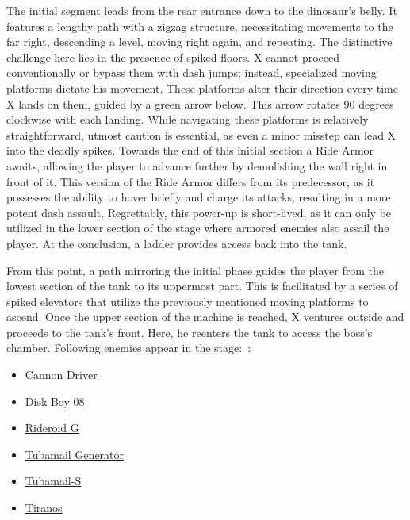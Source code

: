 The initial segment leads from the rear entrance down to the dinosaur's belly. It features a lengthy path with a zigzag structure, necessitating movements to the far right, descending a level, moving right again, and repeating. The distinctive challenge here lies in the presence of spiked floors. X cannot proceed conventionally or bypass them with dash jumps; instead, specialized moving platforms dictate his movement. These platforms alter their direction every time X lands on them, guided by a green arrow below. This arrow rotates 90 degrees clockwise with each landing. While navigating these platforms is relatively straightforward, utmost caution is essential, as even a minor misstep can lead X into the deadly spikes. Towards the end of this initial section a Ride Armor awaits, allowing the player to advance further by demolishing the wall right in front of it. This version of the Ride Armor differs from its predecessor, as it possesses the ability to hover briefly and charge its attacks, resulting in a more potent dash assault. Regrettably, this power-up is short-lived, as it can only be utilized in the lower section of the stage where armored enemies also assail the player. At the conclusion, a ladder provides access back into the tank.

From this point, a path mirroring the initial phase guides the player from the lowest section of the tank to its uppermost part. This is facilitated by a series of spiked elevators that utilize the previously mentioned moving platforms to ascend. Once the upper section of the machine is reached, X ventures outside and proceeds to the tank's front. Here, he  reenters the tank to access the boss's chamber.
Following enemies appear in the stage:~\cite{wiki:Dinosaur_tank}:
\begin{itemize}
	\item \hyperlink {enem:Cannon_Driver}{Cannon Driver}
	\item \hyperlink {enem:Disk_Boy_08}{Disk Boy 08}
	\item \hyperlink {enem:Rideroid G}{Rideroid G}
	\item \hyperlink {enem:Tubamail_Generator}{Tubamail Generator}
	\item \hyperlink {enem:Tubamail-S}{Tubamail-S}
	\item \hyperlink {enem:Tiranos}{Tiranos}
\end{itemize}


